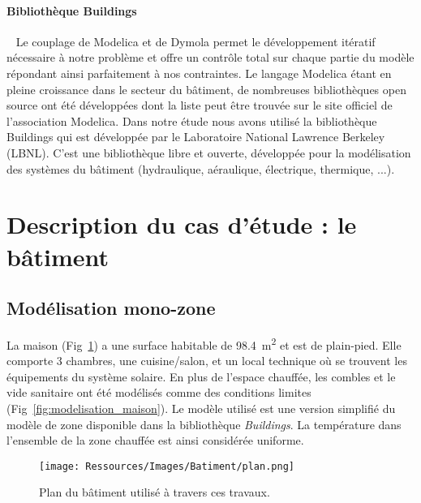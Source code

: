 \paragraph{Bibliothèque Buildings} %
\label{par:bibliotheque_buildings}
~
Le couplage de Modelica et de Dymola permet le développement itératif nécessaire à notre
problème et offre un contrôle total sur chaque partie du modèle répondant ainsi
parfaitement à nos contraintes. Le langage Modelica étant en pleine croissance dans le
secteur du bâtiment, de nombreuses bibliothèques open source ont été développées dont la
liste peut être trouvée sur le site officiel de l’association Modelica. Dans notre étude
nous avons utilisé la bibliothèque Buildings qui est développée par le Laboratoire
National Lawrence Berkeley (LBNL). C’est une bibliothèque libre et ouverte, développée
pour la modélisation des systèmes du bâtiment (hydraulique, aéraulique, électrique,
thermique, ...).





\section{Description du cas d’étude : le bâtiment} %
\label{sec:description_du_cas_d_etude_le_batiment}
\subsection{Modélisation mono-zone} %
\label{sub:modelisation_monozone}
La maison (Fig~\ref{fig:plan_maison}) a une surface habitable de \SI{98.4}{\meter\squared}
et est de plain-pied.
Elle comporte 3 chambres, une cuisine/salon, et un local technique où se
trouvent les équipements du système solaire.
En plus de l’espace chauffée, les combles et le vide sanitaire ont été modélisés
comme des conditions limites (Fig~\ref{fig:modelisation_maison}). Le modèle utilisé est une version
simplifié du modèle de zone disponible dans la bibliothèque \textit{Buildings}.
La température dans l’ensemble de la zone chauffée est ainsi considérée uniforme.
\begin{figure}
    \begin{center}
        \texttt{[image: Ressources/Images/Batiment/plan.png]}
    \end{center}
    \caption{Plan du bâtiment utilisé à travers ces travaux.
             \label{fig:plan_maison}}
\end{figure}

